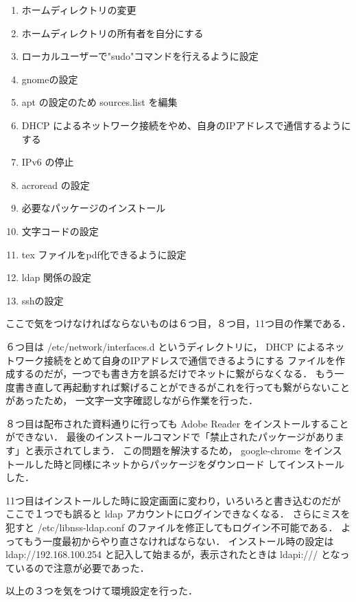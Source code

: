 \begin{enumerate}
    \item ホームディレクトリの変更  %
    \item ホームディレクトリの所有者を自分にする  %
    \item ローカルユーザーで"sudo"コマンドを行えるように設定  %
    \item gnomeの設定  %
    \item apt の設定のため sources.list を編集  %
    \item DHCP によるネットワーク接続をやめ、自身のIPアドレスで通信するようにする  %
    \item IPv6 の停止  %
    \item acroread の設定  %
    \item 必要なパッケージのインストール
    \item 文字コードの設定  %
    \item tex ファイルをpdf化できるように設定  %
    \item ldap 関係の設定  %
    \item sshの設定\leavevmode \\  %
\end{enumerate}


ここで気をつけなければならないものは６つ目，８つ目，11つ目の作業である．

６つ目は /etc/network/interfaces.d というディレクトリに，
DHCP によるネットワーク接続をとめて自身のIPアドレスで通信できるようにする
ファイルを作成するのだが，一つでも書き方を誤るだけでネットに繋がらなくなる．
もう一度書き直して再起動すれば繋げることができるがこれを行っても繋がらないことがあったため，
一文字一文字確認しながら作業を行った．

８つ目は配布された資料通りに行っても Adobe Reader をインストールすることができない．
最後のインストールコマンドで「禁止されたパッケージがあります」と表示されてしまう．
この問題を解決するため， google-chrome をインストールした時と同様にネットからパッケージをダウンロード
してインストールした．

11つ目はインストールした時に設定画面に変わり，いろいろと書き込むのだが
ここで１つでも誤ると ldap アカウントにログインできなくなる．
さらにミスを犯すと /etc/libnss-ldap.conf のファイルを修正してもログイン不可能である．
よってもう一度最初からやり直さなければならない．
インストール時の設定は ldap://192.168.100.254 と記入して始まるが，表示されたときは
 ldapi:/// となっているので注意が必要であった．

以上の３つを気をつけて環境設定を行った．


